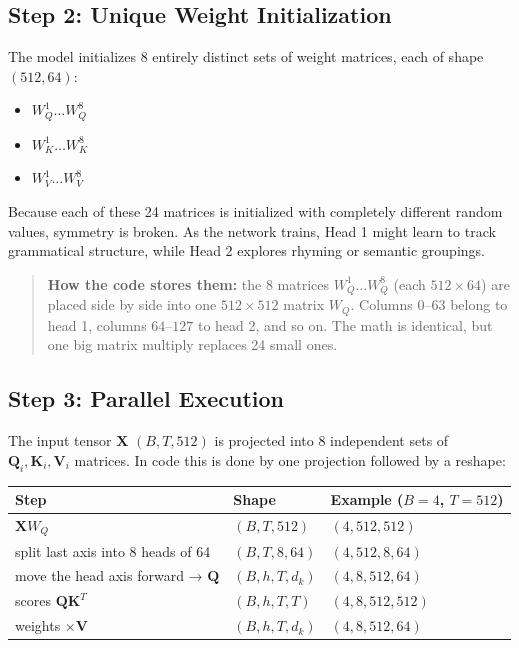 \documentclass[11pt,a4paper,oneside]{report}
\providecommand{\tightlist}{\setlength{\itemsep}{0pt}\setlength{\parskip}{0pt}}
\begin{document}
\subsection{Step 2: Unique Weight Initialization}\label{step-2-unique-weight-initialization}

The model initializes 8 entirely distinct sets of weight matrices, each of shape \((512, 64)\):

\begin{itemize}
\tightlist
\item
  \textbf{\(W_Q^1 \dots W_Q^8\)}
\item
  \textbf{\(W_K^1 \dots W_K^8\)}
\item
  \textbf{\(W_V^1 \dots W_V^8\)}
\end{itemize}

Because each of these 24 matrices is initialized with completely different random values, symmetry is broken. As the network trains, Head 1 might learn to track grammatical structure, while Head 2 explores rhyming or semantic groupings.

\begin{quote}
\textbf{How the code stores them:} the 8 matrices \(W_Q^1 \dots W_Q^8\) (each \(512 \times 64\)) are placed side by side into one \(512 \times 512\) matrix \(W_Q\). Columns \(0\)--\(63\) belong to head 1, columns \(64\)--\(127\) to head 2, and so on. The math is identical, but one big matrix multiply replaces 24 small ones.
\end{quote}

\subsection{Step 3: Parallel Execution}\label{step-3-parallel-execution}

The input tensor \(\mathbf{X}\) \((B, T, 512)\) is projected into 8 independent sets of \(\mathbf{Q}_i, \mathbf{K}_i, \mathbf{V}_i\) matrices. In code this is done by one projection followed by a reshape:

{\def\LTcaptype{none} %
\begin{longtable}[]{@{}lll@{}}
\toprule\noalign{}
Step & Shape & Example (\(B = 4\), \(T = 512\)) \\
\midrule\noalign{}
\endhead
\bottomrule\noalign{}
\endlastfoot
\(\mathbf{X} W_Q\) & \((B,\allowbreak T,\allowbreak 512)\) & \((4,\allowbreak 512,\allowbreak 512)\) \\
split last axis into 8 heads of 64 & \((B,\allowbreak T,\allowbreak 8,\allowbreak 64)\) & \((4,\allowbreak 512,\allowbreak 8,\allowbreak 64)\) \\
move the head axis forward → \(\mathbf{Q}\) & \((B,\allowbreak h,\allowbreak T,\allowbreak d_k)\) & \((4,\allowbreak 8,\allowbreak 512,\allowbreak 64)\) \\
scores \(\mathbf{Q}\mathbf{K}^T\) & \((B,\allowbreak h,\allowbreak T,\allowbreak T)\) & \((4,\allowbreak 8,\allowbreak 512,\allowbreak 512)\) \\
weights \(\times \mathbf{V}\) & \((B,\allowbreak h,\allowbreak T,\allowbreak d_k)\) & \((4,\allowbreak 8,\allowbreak 512,\allowbreak 64)\) \\
\end{longtable}
}
\end{document}

